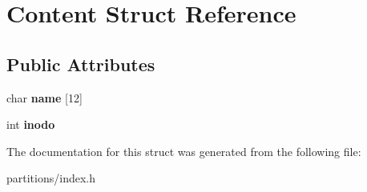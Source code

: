 \hypertarget{structContent}{}\section{Content Struct Reference}
\label{structContent}
\subsection*{Public Attributes}
\begin{DoxyCompactItemize}
\item 
\mbox{\label{structContent_ab53e9e33f352e8f5cc4b0fa4aea82a03}} 
char {\bfseries name} \mbox{[}12\mbox{]}
\item 
\mbox{\label{structContent_a39332cd745caaeff2667e564c1220adf}} 
int {\bfseries inodo}
\end{DoxyCompactItemize}


The documentation for this struct was generated from the following file\+:\begin{DoxyCompactItemize}
\item 
partitions/index.\+h\end{DoxyCompactItemize}
